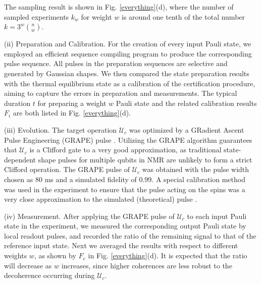\documentclass[prl,twocolumn,showpacs]{revtex4-1}
\begin{document}
The sampling result is shown in Fig. \ref{everything}(d), where the number of sampled experiments $k_w$ for weight $w$ is around one tenth of the total number $k = 3^w\binom{n}{w}$.

(ii) Preparation and Calibration. For the creation of every input Pauli state, we employed an efficient sequence compiling program \cite{Ryan2008} to produce the corresponding pulse sequence. All pulses in the preparation sequences are selective and generated by Gaussian shapes. We then compared the state preparation results with the thermal equilibrium state as a calibration of the certification procedure, aiming to capture the errors in preparation and measurements. The typical duration $t$ for preparing a weight $w$ Pauli state and the related calibration results $F_i$ are both listed in Fig. \ref{everything}(d).

(iii) Evolution. The target operation $\mathcal{U}_{c}$ was optimized by a GRadient Ascent Pulse Engineering (GRAPE) pulse \cite{Khaneja2005}. Utilizing the GRAPE algorithm guarantees that $\mathcal{U}_{c}$ is a Clifford gate to a very good approximation, as traditional state-dependent shape pulses for multiple qubits in NMR are unlikely to form a strict Clifford operation. The GRAPE pulse of $\mathcal{U}_{c}$ was obtained with the pulse width chosen as 80 ms and a simulated fidelity of 0.99. A special calibration method was used in the experiment to ensure that the pulse acting on the spins was a very close approximation to the simulated (theoretical) pulse \cite{Weinstein2004}.

(iv) Measurement. After applying the GRAPE pulse of $\mathcal{U}_{c}$ to each input Pauli state in the experiment, we measured the corresponding output Pauli state by local readout pulses, and recorded the ratio of the remaining signal to that of the reference input state.  Next we averaged the results with respect to different weights $w$, as shown by $F_e$ in Fig. \ref{everything}(d). It is expected that the ratio will decrease as $w$ increases, since  higher coherences are less robust to the decoherence occurring during   $\mathcal{U}_{c}$.
\end{document}
